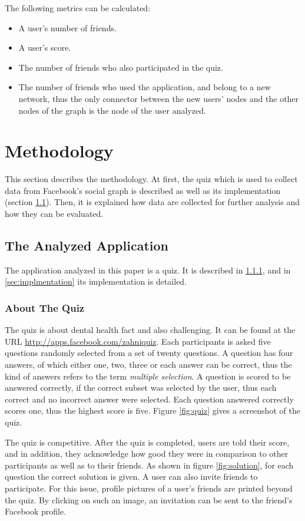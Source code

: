 \documentclass[preprint,12pt]{elsarticle}
\begin{document}
The following metrics can be calculated:

\begin{itemize}
\item A user's number of friends.
\item A user's score.
\item The number of friends who also participated in the quiz.
\item The number of friends who used the application, and belong to a
new network, thus the only connector between the new users' nodes and
the other nodes of the graph is the node of the user analyzed.
\end{itemize}


\section{Methodology}
\label{sec:method}
This section describes the methodology. At first, the quiz which is
used to collect data from Facebook's social graph is described as well
as its implementation (section \ref{sec:quiz}).
Then, it is explained how data are collected for
further analysis and how they can be evaluated.

\subsection{The Analyzed Application}
\label{sec:quiz}
The application analyzed in this paper is a quiz. It is described in
\ref{sec:aboutQuiz}, and in \ref{sec:implmentation} its implementation
is detailed.

\subsubsection{About The Quiz}
\label{sec:aboutQuiz}
The quiz is about dental health fact and also challenging. It can be
found at the URL \url{http://apps.facebook.com/zahniquiz}.
Each participants is asked five questions randomly selected
from a set of twenty questions. A question has four answers, of
which either one, two, three or each answer can be correct, thus
the kind of answers refers to the term \textit{multiple selection}.
A question is scored to be answered correctly, if the correct subset
was selected by the user, thus each correct and no incorrect answer
were selected. Each question answered correctly scores one, thus the
highest score is five. Figure \ref{fig:quiz} gives a screenshot of the quiz. 

The quiz is competitive. After the quiz is completed, users are told
their score, and in addition, they acknowledge how good they were in
comparison to other participants as well as to their 
friends. As shown in figure \ref{fig:solution}, for each question the
correct solution is given. A user can also invite friends to
participate. For this issue, profile pictures of a user's friends are
printed beyond the quiz. By clicking on such an image, an invitation
can be sent to the friend's Facebook profile. 
\end{document}
